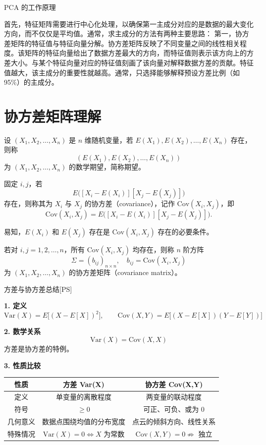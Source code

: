PCA 的工作原理

首先，特征矩阵需要进行中心化处理，以确保第一主成分对应的是数据的最大变化方向，而不仅仅是平均值。通常，求主成分的方法有两种主要思路：
第一，协方差矩阵的特征值与特征向量分解。协方差矩阵反映了不同变量之间的线性相关程度。该矩阵的特征向量给出了数据方差最大的方向，而特征值则表示该方向上的方差大小。与某个特征向量对应的特征值刻画了该向量对解释数据方差的贡献。特征值越大，该主成分的重要性就越高。通常，只选择能够解释预设方差比例（如 95\%）的主成分。
\section{协方差矩阵理解}
\begin{definition}[3.3.1]
设 $(X_1, X_2, \ldots, X_n)$ 是 $n$ 维随机变量，若 $E(X_1), E(X_2), \ldots, E(X_n)$ 存在，则称 
\[
(E(X_1), E(X_2), \ldots, E(X_n))
\]
为 $(X_1, X_2, \ldots, X_n)$ 的数学期望，简称期望。  

\medskip
固定 $i,j$，若 
\[
E\bigl([X_i - E(X_i)][X_j - E(X_j)]\bigr)
\]
存在，则称其为 $X_i$ 与 $X_j$ 的协方差（covariance），记作 $\mathrm{Cov}(X_i, X_j)$，即
\[
\mathrm{Cov}(X_i, X_j) = E\bigl([X_i - E(X_i)][X_j - E(X_j)]\bigr).
\]

\medskip
易知，$E(X_i)$ 和 $E(X_j)$ 存在是 $\mathrm{Cov}(X_i, X_j)$ 存在的必要条件。  

\medskip
若对 $i,j = 1,2,\ldots,n$，所有 $\mathrm{Cov}(X_i, X_j)$ 均存在，则称 $n$ 阶方阵
\[
\Sigma = (b_{ij})_{n\times n}, \quad b_{ij} = \mathrm{Cov}(X_i, X_j)
\]
为 $(X_1, X_2, \ldots, X_n)$ 的协方差矩阵（covariance matrix）。
\end{definition}


\begin{dxtips}{方差与协方差总结}[PS]\label{dx:any-construct}


\textbf{1. 定义}  
\[
\mathrm{Var}(X) = E\big[(X - E[X])^2\big], \qquad
\mathrm{Cov}(X,Y) = E\big[(X - E[X])(Y - E[Y])\big]
\]

\medskip
\textbf{2. 数学关系}  
\[
\mathrm{Var}(X) = \mathrm{Cov}(X,X)
\]
方差是协方差的特例。

\medskip
\textbf{3. 性质比较}  

\begin{tabular}{|c|c|c|}
\hline
性质 & 方差 Var(X) & 协方差 Cov(X,Y) \\\hline
定义 & 单变量的离散程度 & 两变量的联动程度 \\\hline
符号 & $\ge 0$ & 可正、可负、或为 0 \\\hline
几何意义 & 数据点围绕均值的分布宽度 & 点云的倾斜方向、线性关系 \\\hline
特殊情况 & $\mathrm{Var}(X)=0 \iff X$ 为常数 & $\mathrm{Cov}(X,Y)=0 \not\Rightarrow$ 独立 \\\hline
\end{tabular}


\end{dxtips}

